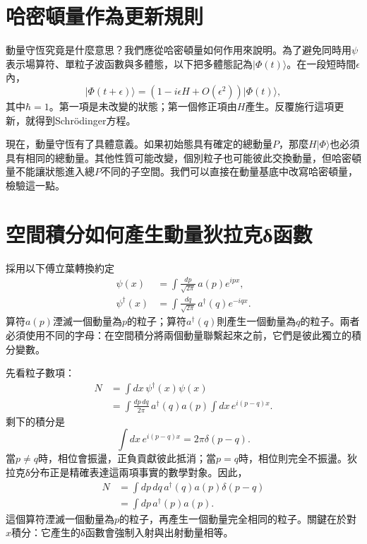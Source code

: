 \section{哈密頓量作為更新規則}

動量守恆究竟是什麼意思？我們應從哈密頓量如何作用來說明。為了避免同時用\(\psi\)表示場算符、單粒子波函數與多體態，以下把多體態記為\(\lvert\Phi(t)\rangle\)。在一段短時間\(\epsilon\)內，
\begin{equation}
\lvert\Phi(t+\epsilon)\rangle
=\left(1-i\epsilon H+O(\epsilon^2)\right)
\lvert\Phi(t)\rangle,
\label{eq:l9-short-update}
\end{equation}
其中\(\hbar=1\)。第一項是未改變的狀態；第一個修正項由\(H\)產生。反覆施行這項更新，就得到Schr\"odinger方程。

現在，動量守恆有了具體意義。如果初始態具有確定的總動量\(P\)，那麼\(H\lvert\Phi\rangle\)也必須具有相同的總動量。其他性質可能改變，個別粒子也可能彼此交換動量，但哈密頓量不能讓狀態進入總\(P\)不同的子空間。我們可以直接在動量基底中改寫哈密頓量，檢驗這一點。

\section{空間積分如何產生動量狄拉克{\proseunicodefont δ}函數}

採用以下傅立葉轉換約定
\begin{align}
\psi(x)&=\int\frac{dp}{\sqrt{2\pi}}\,a(p)e^{ipx},\\
\psi^\dagger(x)&=\int\frac{dq}{\sqrt{2\pi}}\,a^\dagger(q)e^{-iqx}.
\label{eq:l9-field-fourier}
\end{align}
算符\(a(p)\)湮滅一個動量為\(p\)的粒子；算符\(a^\dagger(q)\)則產生一個動量為\(q\)的粒子。兩者必須使用不同的字母：在空間積分將兩個動量聯繫起來之前，它們是彼此獨立的積分變數。

先看粒子數項：
\begin{align}
N
&=\int dx\,\psi^\dagger(x)\psi(x)\\
&=\int\frac{dp\,dq}{2\pi}\,
a^\dagger(q)a(p)
\int dx\,e^{i(p-q)x}.
\end{align}
剩下的積分是
\begin{equation}
\int dx\,e^{i(p-q)x}=2\pi\delta(p-q).
\end{equation}
當\(p\ne q\)時，相位會振盪，正負貢獻彼此抵消；當\(p=q\)時，相位則完全不振盪。狄拉克{\proseunicodefont δ}分布正是精確表達這兩項事實的數學對象。因此，
\begin{align}
N
&=\int dp\,dq\,a^\dagger(q)a(p)\delta(p-q)\\
&=\int dp\,a^\dagger(p)a(p).
\label{eq:l9-number-momentum}
\end{align}
這個算符湮滅一個動量為\(p\)的粒子，再產生一個動量完全相同的粒子。關鍵在於對\(x\)積分：它產生的{\proseunicodefont δ}函數會強制入射與出射動量相等。

